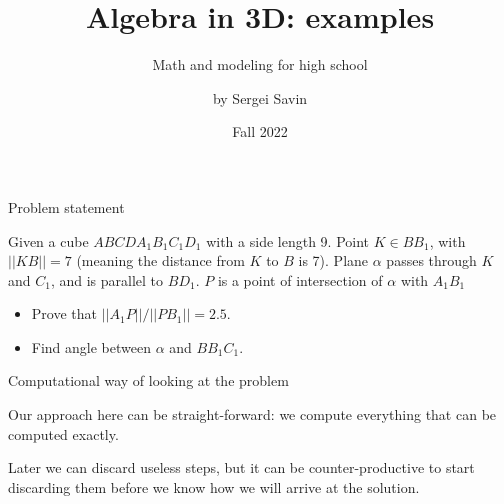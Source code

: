 \documentclass{beamer}
\title{Algebra in 3D: examples}
\subtitle{Math and modeling for high school}
\author{by Sergei Savin}
\date{Fall 2022}
\begin{document}
\maketitle


%
%



\begin{frame}{Problem statement}
	\begin{flushleft}
		
		Given a cube $ABCD A_1 B_1 C_1 D_1$ with a side length 9. Point $K \in BB_1$, with $||KB|| = 7$ (meaning the distance from $K$ to $B$ is 7). Plane $\alpha$ passes through $K$ and $C_1$, and is parallel to $BD_1$. $P$ is a point of intersection of $\alpha$ with $A_1 B_1$
		
		\bigskip
		
		\begin{itemize}
			\item 	Prove that $||A_1 P|| / ||PB_1|| = 2.5$.
			
			\item Find angle between $\alpha$ and $B B_1 C_1$.
		\end{itemize}
	
		
	\end{flushleft}
\end{frame}



\begin{frame}{Computational way of looking at the problem}
	\begin{flushleft}
		
		Our approach here can be straight-forward: we compute everything that can be computed exactly. 
		
		\bigskip
		
		Later we can discard useless steps, but it can be counter-productive to start discarding them before we know how we will arrive at the solution.
		
	\end{flushleft}
\end{frame}
\end{document}
